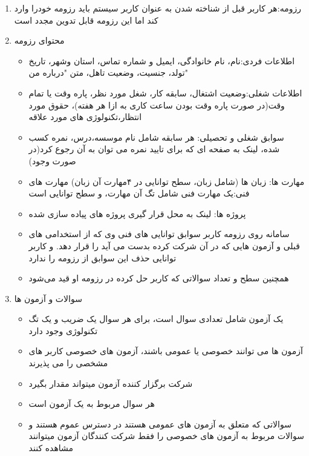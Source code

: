 \documentclass{article}
\begin{document}
\begin{enumerate}[\hspace{1cm}1.]
        \item رزومه:هر کاربر قبل از شناخته شدن به عنوان کاربر سیستم باید رزومه خودرا وارد کند اما این رزومه قابل تدوین مجدد است
        \item محتوای رزومه
        \begin{itemize}
            \item اطلاعات فردی:نام، نام خانوادگی، ایمیل و شماره تماس، استان وشهر، تاریخ تولد، جنسیت، وضعیت تاهل، متن "درباره من"
            \item اطلاعات شغلی:وضعیت اشتغال، سابقه کار، شغل مورد نظر، پاره وقت یا تمام وقت(در صورت پاره وقت بودن ساعت کاری به ازا هر هفته)، حقوق مورد انتظار،تکنولوژی های مورد علاقه
            \item سوابق شغلی و تحصیلی: هر سابقه شامل نام موسسه،درس، نمره کسب شده، لینک به صفحه ای که برای تایید نمره می توان به آن رجوع کرد(در صورت وجود)
            \item مهارت ها: زبان ها (شامل زبان، سطح توانایی در ۴مهارت آن زبان) مهارت های فنی:یک مهارت فنی شامل تگ آن مهارت، و سطح توانایی است
            \item پروژه ها: لینک به محل قرار گیری پروژه های پیاده سازی شده
            \item سامانه روی رزومه کاربر سوابق توانایی های فنی وی که از استخدامی های قبلی و آزمون هایی که در آن شرکت کرده بدست می آید را قرار دهد. و کاربر توانایی حذف این سوابق از رزومه را ندارد     
            \item همچنین سطح و تعداد سوالاتی که کاربر حل کرده در رزومه او قید می‌شود
        \end{itemize}
        
        \item سوالات و آزمون ها
        \begin{itemize}
            \item  یک آزمون شامل تعدادی سوال است، برای هر سوال یک ضریب و یک تگ تکنولوژی وجود دارد
            \item آزمون ها می توانند خصوصی یا عمومی باشند، آزمون های خصوصی کاربر های مشخصی را می پذیرند
            \item شرکت برگزار کننده آزمون میتواند مقدار  بگیرد
            
            \item هر سوال مربوط به یک آزمون است
            \item سوالاتی که متعلق به آزمون های عمومی هستند در دسترس عموم هستند و سوالات مربوط به آزمون های خصوصی را فقط شرکت کنندگان آزمون میتوانند مشاهده کنند
        \end{itemize}
        

\end{enumerate}
\end{document}
